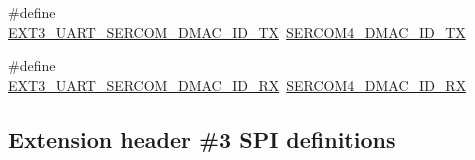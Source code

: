 \begin{DoxyCompactItemize}
\item 
\#define \mbox{\hyperlink{group__samd21__xplained__pro__features__group_ga9549e7ab457eb822b2c4ee339ff1dde9}{E\+X\+T3\+\_\+\+U\+A\+R\+T\+\_\+\+S\+E\+R\+C\+O\+M\+\_\+\+D\+M\+A\+C\+\_\+\+I\+D\+\_\+\+TX}}~\mbox{\hyperlink{sercom4_8h_aeedc76f0fc42937b376b147db4319b37}{S\+E\+R\+C\+O\+M4\+\_\+\+D\+M\+A\+C\+\_\+\+I\+D\+\_\+\+TX}}
\item 
\#define \mbox{\hyperlink{group__samd21__xplained__pro__features__group_ga47e31e167cd6339e3e1f88220a7a6b1a}{E\+X\+T3\+\_\+\+U\+A\+R\+T\+\_\+\+S\+E\+R\+C\+O\+M\+\_\+\+D\+M\+A\+C\+\_\+\+I\+D\+\_\+\+RX}}~\mbox{\hyperlink{sercom4_8h_a7de8cf9e95745263a230853b13188522}{S\+E\+R\+C\+O\+M4\+\_\+\+D\+M\+A\+C\+\_\+\+I\+D\+\_\+\+RX}}
\end{DoxyCompactItemize}
\subsection*{Extension header \#3 S\+PI definitions}
